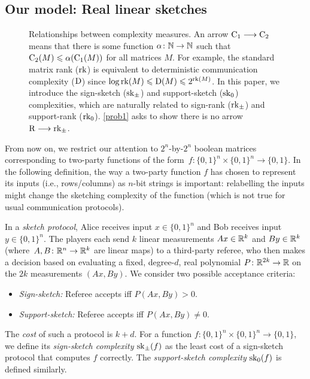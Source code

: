 \documentclass{article}
\begin{document}
\subsection{Our model: Real linear sketches} \label{sec:sketch-def}

\begin{figure}[t]
    \centering
    
        \caption{Relationships between complexity measures. An arrow $\operatorname{C}_1 \longrightarrow\operatorname{C}_2$ means that there is some function $\alpha\colon\mathbb{N}\to\mathbb{N}$ such that $\operatorname{C}_2(M)\leqslant \alpha(\operatorname{C}_1(M))$ for all matrices $M$. For example, the standard matrix rank ($\operatorname{rk}$) is equivalent to deterministic communication complexity ($\operatorname{D}$) since $\log\operatorname{rk}(M)\leqslant\operatorname{D}(M)\leqslant 2^{\operatorname{rk}(M)}$. In this paper, we introduce the sign-sketch ($\operatorname{sk}_\pm$) and support-sketch ($\operatorname{sk}_0$) complexities, which are naturally related to sign-rank ($\operatorname{rk}_\pm$) and support-rank ($\operatorname{rk}_0$). \cref{prob1} asks to show there is no arrow $\operatorname{R}\longrightarrow\operatorname{rk}_\pm$.}
    \label{fig:diagram}
\end{figure}

From now on, we restrict our attention to $2^n$-by-$2^n$ boolean matrices corresponding to two-party functions of the form~$f\colon\{0,1\}^n\times\{0,1\}^n\to\{0,1\}$. In the following definition, the way a two-party function $f$ has chosen to represent its inputs (i.e., rows/columns) as $n$-bit strings is important: relabelling the inputs might change the sketching complexity of the function (which is not true for usual communication protocols).
\begin{boxdefinition}
In a \emph{sketch protocol}, Alice receives input $x\in\{0,1\}^n$ and Bob receives input $y\in\{0,1\}^n$. The players each send $k$ linear measurements $Ax \in\mathbb{R}^k$ and $By\in\mathbb{R}^k$ (where~$A,B\colon\mathbb{R}^n \to \mathbb{R}^k$ are linear maps) to a third-party referee, who then makes a decision based on evaluating a fixed, degree-$d$, real polynomial $P\colon \mathbb{R}^{2k}\to\mathbb{R}$ on the $2k$ measurements $(Ax,By)$. We consider two possible acceptance criteria:
\begin{itemize}[label=$-$,noitemsep]
    \item \emph{Sign-sketch:} Referee accepts iff $P(Ax,By)> 0$.
    \item \emph{Support-sketch:} Referee accepts iff $P(Ax,By)\neq 0$.
\end{itemize}
The \emph{cost} of such a protocol is $k+d$. For a  function $f\colon\{0,1\}^n\times\{0,1\}^n\to\{0,1\}$, we define its \emph{sign-sketch complexity} $\operatorname{sk}_\pm(f)$ as the least cost of a sign-sketch protocol that computes $f$ correctly. The \emph{support-sketch complexity} $\operatorname{sk}_0(f)$ is defined similarly.
\end{boxdefinition}
\end{document}
